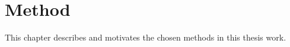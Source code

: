 \chapter{Method}\label{method}
This chapter describes and motivates the chosen methods in this thesis work.






